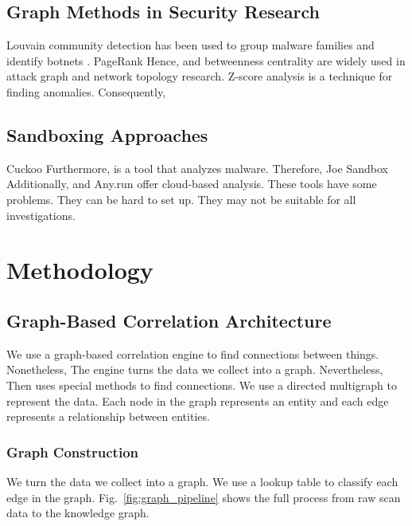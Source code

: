 \documentclass[conference]{IEEEtran}
\begin{document}
\subsection{Graph Methods in Security Research}

Louvain community detection \cite{blondel2008} has been used to group malware families \cite{jang2018} and identify botnets \cite{liao2019}. PageRank Hence, \cite{pagerank} and betweenness centrality \cite{brandes2001} are widely used in attack graph and network topology research. Z-score analysis \cite{hawkins1980} is a technique for finding anomalies. Consequently,

\subsection{Sandboxing Approaches}

Cuckoo Furthermore, \cite{cuckoo} is a tool that analyzes malware. Therefore, Joe Sandbox Additionally, \cite{joesandbox} and Any.run \cite{anyrun} offer cloud-based analysis. These tools have some problems. They can be hard to set up. They may not be suitable for all investigations.

\section{Methodology}
\label{sec:methodology}

\subsection{Graph-Based Correlation Architecture}

We use a graph-based correlation engine to find connections between things. Nonetheless, The engine turns the data we collect into a graph. Nevertheless, Then uses special methods to find connections. We use a directed multigraph to represent the data. Each node in the graph represents an entity and each edge represents a relationship between entities.

\subsubsection{Graph Construction}

We turn the data we collect into a graph. We use a lookup table to classify each edge in the graph. Fig.~\ref{fig:graph_pipeline} shows the full process from raw scan data to the knowledge graph.
\end{document}
